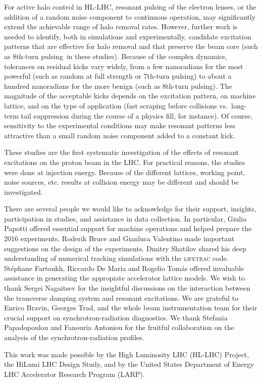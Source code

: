\documentclass[
prstab
,reprint
,linenumbers
,longbibliography
,preprintnumbers
,showkeys
,amsfonts,amssymb,amsmath
,floatfix
]{revtex4-1}
\newcommand{\code}[1]{\textsc{#1}} %
\newcommand{\seventhtp}{7th-turn pulsing}
\newcommand{\eighthtp}{8th-turn pulsing}
\begin{document}
For active halo control in HL-LHC, resonant pulsing of the electron
lenses, or the addition of a random noise component to continuous
operation, may significantly extend the achievable range of halo
removal rates. However, further work is needed to identify, both in
simulations and experimentally, candidate excitation patterns that are
effective for halo removal and that preserve the beam core (such as
\eighthtp\ in these studies). Because of the complex dynamics,
tolerances on residual kicks vary widely, from a few nanoradians for
the most powerful (such as random at full strength or \seventhtp) to
about a hundred nanoradians for the more benign (such as
\eighthtp). The magnitude of the acceptable kicks depends on the
excitation pattern, on machine lattice, and on the type of application
(fast scraping before collisions vs.\ long-term tail suppression
during the course of a physics fill, for instance). Of course,
sensitivity to the experimental conditions may make resonant patterns
less attractive than a small random noise component added to a
constant kick.

These studies are the first systematic investigation of the effects of
resonant excitations on the proton beam in the LHC.  For practical
reasons, the studies were done at injection energy. Because of the
different lattices, working point, noise sources, etc. results at
collision energy may be different and should be investigated.


\begin{acknowledgments}
  There are several people we would like to acknowledge for their
  support, insights, participation in studies, and assistance in data
  collection. In particular, Giulia Pa\-potti offered essential
  support for machine operations and helped prepare the 2016
  experiments. Roderik Bruce and Gianluca Va\-len\-ti\-no made
  important suggestions on the design of the experiments. Dmitry
  Sha\-ti\-lov shared his deep understanding of numerical tracking
  simulations with the \code{lifetrac} code. St\'{e}\-phane
  Far\-toukh, Ric\-car\-do De Maria and Ro\-ge\-lio Tom\'{a}s offered
  invaluable assistance in generating the appropiate accelerator
  lattice models. We wish to thank Sergei Na\-gai\-tsev for the
  insightful discussions on the interaction between the transverse
  damping system and resonant excitations. We are grateful to
  En\-ri\-co Bra\-vin, Georges Trad, and the whole beam
  instrumentation team for their crucial support on
  synchrotron-radiation diagnostics. We thank Ste\-fania
  Pa\-pa\-do\-pou\-lou and Fa\-nou\-ria An\-to\-niou for the fruitful
  collaboration on the analysis of the synchrotron-radiation profiles.

  This work was made possible by the High Luminosity LHC (HL-LHC)
  Project, the HiLumi LHC Design Study, and by the United States
  Department of Energy LHC Accelerator Research Program (LARP).
\end{acknowledgments}



\end{document}
